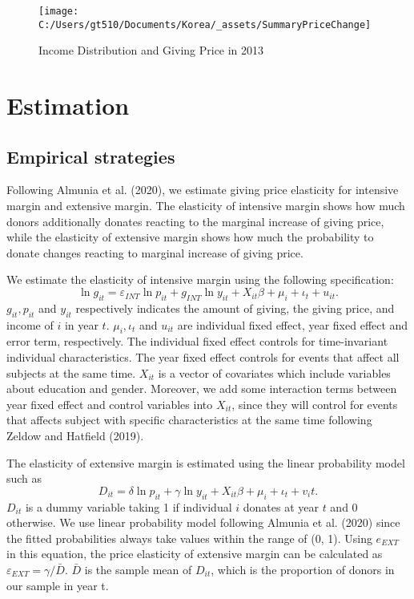 \documentclass[ review  , 3p ]{elsarticle}
\begin{document}
  \begin{figure}
  
  {\centering \texttt{[image: C:/Users/gt510/Documents/Korea/\_assets/SummaryPriceChange]} 
  
  }
  
  \caption{Income Distribution and Giving Price in 2013}\label{fig:unnamed-chunk-1}
  \end{figure}
  
  \hypertarget{estimation}{%
  \section{Estimation}\label{estimation}}
  
  \hypertarget{empirical-strategies}{%
  \subsection{Empirical strategies}\label{empirical-strategies}}
  
  Following Almunia et al. (2020), we estimate giving price elasticity for intensive margin and extensive margin. The elasticity of intensive margin shows how much donors additionally donates reacting to the marginal increase of giving price, while the elasticity of extensive margin shows how much the probability to donate changes reacting to marginal increase of giving price.
  
  We estimate the elasticity of intensive margin using the following specification:
  \[
  \ln g_{it} = \varepsilon_{INT} \ln p_{it} +g_{INT} \ln y_{it} + X_{it}\beta +\mu_i +\iota_t +u_{it}. \label{intensive}
  \]
  \(g_{it}, p_{it}\) and \(y_{it}\) respectively indicates the amount of giving, the giving price, and income of \(i\) in year \(t\). \(\mu_i, \iota_t\) and \(u_{it}\) are individual fixed effect, year fixed effect and error term, respectively.
  The individual fixed effect controls for time-invariant individual characteristics. The year fixed effect controls for events that affect all subjects at the same time. \(X_{it}\) is a vector of covariates which include variables about education and gender. Moreover, we add some interaction terms between year fixed effect and control variables into \(X_{it}\), since they will control for events that affects subject with specific characteristics at the same time following Zeldow and Hatfield (2019).
  
  The elasticity of extensive margin is estimated using the linear probability model such as
  \[
  D_{it} =  \delta \ln p_{it} +\gamma \ln y_{it} + X_{it}\beta+\mu_i  +\iota_t +v_it. \label{extensive}
  \]
  \(D_{it}\) is a dummy variable taking 1 if individual \(i\) donates at year \(t\) and 0 otherwise. We use linear probability model following Almunia et al. (2020) since the fitted probabilities always take values within the range of (0, 1). Using \(e_{EXT}\) in this equation, the price elasticity of extensive margin can be calculated as \(\varepsilon_{EXT} = \gamma/\bar{D}\). \(\bar{D}\) is the sample mean of \(D_{it}\), which is the proportion of donors in our sample in year t.
  
\end{document}
